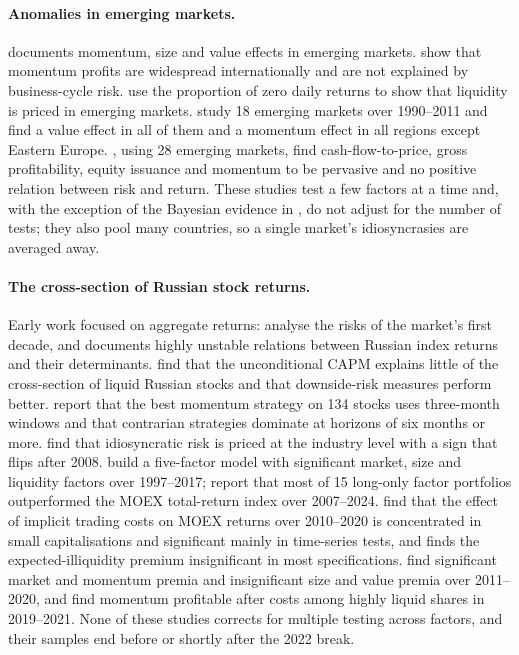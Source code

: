 \documentclass[11pt]{article}
\begin{document}
\paragraph{Anomalies in emerging markets.}
\citet{rouwenhorst1999local} documents momentum, size and value effects in emerging markets.
\citet{griffin2003momentum} show that momentum profits are widespread internationally and are not explained by
business-cycle risk. \citet{bekaert2007liquidity} use the proportion of zero daily returns to show that liquidity is
priced in emerging markets. \citet{cakici2013size} study 18 emerging markets over 1990--2011 and find a value effect
in all of them and a momentum effect in all regions except Eastern Europe. \citet{hanauer2019cross}, using 28
emerging markets, find cash-flow-to-price, gross profitability, equity issuance and momentum to be pervasive and no
positive relation between risk and return. These studies test a few factors at a time and, with the exception of
the Bayesian evidence in \citet{jensen2023replication}, do not adjust for the number of tests; they also pool many
countries, so a single market's idiosyncrasies are averaged away.

\paragraph{The cross-section of Russian stock returns.}
Early work focused on aggregate returns: \citet{goriaev2006risks} analyse the risks of the market's first decade, and
\citet{anatolyev2008retrospective} documents highly unstable relations between Russian index returns and their
determinants. \citet{teplova2011higher} find that the unconditional CAPM explains little of the cross-section of
liquid Russian stocks and that downside-risk measures perform better. \citet{teplova2014momentum} report that the
best momentum strategy on 134 stocks uses three-month windows and that contrarian strategies dominate at horizons of
six months or more. \citet{kinnunen2017expected} find that idiosyncratic risk is priced at the industry level with a
sign that flips after 2008. \citet{abramov2019pricing} build a five-factor model with significant market, size and
liquidity factors over 1997--2017; \citet{abramov2025evolution} report that most of 15 long-only factor portfolios
outperformed the MOEX total-return index over 2007--2024. \citet{teplova2022implicit} find that the effect of implicit trading
costs on MOEX returns over 2010--2020 is concentrated in small capitalisations and significant mainly in time-series
tests, and \citet{gurov2023illiquidity} finds the expected-illiquidity premium insignificant in most specifications. \citet{ovechkin2022econometric} find
significant market and momentum premia and insignificant size and value premia over 2011--2020, and
\citet{nazarova2023momentum} find momentum profitable after costs among highly liquid shares in 2019--2021. None of
these studies corrects for multiple testing across factors, and their samples end before or shortly after the 2022
break.
\end{document}
